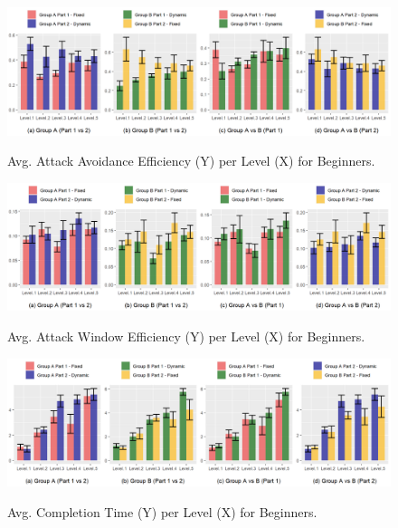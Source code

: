 \begin{figure}[!ht]
    \begin{center}
    \caption{Avg. Attack Avoidance Efficiency (Y) per Level (X) for Beginners.}
        \includegraphics[width=34em]{figures/attack_avoidance_efficiency-beginner_players.png}
        \label{fig:result-metric-beginners-attack-avoidance-efficiency}
    \end{center}
\end{figure}

\begin{figure}[!ht]
    \begin{center}
    \caption{Avg. Attack Window Efficiency (Y) per Level (X) for Beginners.}
        \includegraphics[width=34em]{figures/attack_window_efficiency-beginner_players.png}
        \label{fig:result-metric-beginners-attack-window-efficiency}
    \end{center}
\end{figure}

\begin{figure}[!ht]
    \begin{center}
    \caption{Avg. Completion Time (Y) per Level (X) for Beginners.}
        \includegraphics[width=34em]{figures/completion_time-beginner_players.png}
        \label{fig:result-metric-beginners-completion-time}
    \end{center}
\end{figure}

